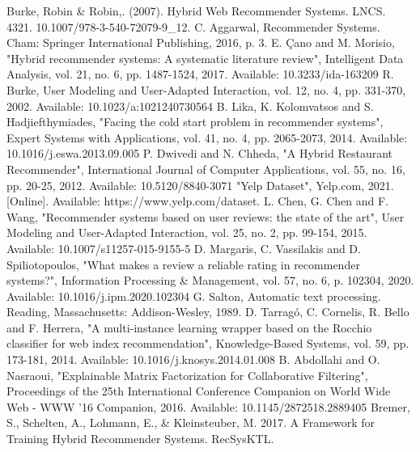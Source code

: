 \documentclass[conference]{IEEEtran}
\begin{document}
\begin{thebibliography}{00}
Burke, Robin \& Robin,. (2007). Hybrid Web Recommender Systems. LNCS. 4321. 10.1007/978-3-540-72079-9\_12.
C. Aggarwal, Recommender Systems. Cham: Springer International Publishing, 2016, p. 3.
E. Çano and M. Morisio, "Hybrid recommender systems: A systematic literature review", Intelligent Data Analysis, vol. 21, no. 6, pp. 1487-1524, 2017. Available: 10.3233/ida-163209
R. Burke, User Modeling and User-Adapted Interaction, vol. 12, no. 4, pp. 331-370, 2002. Available: 10.1023/a:1021240730564
B. Lika, K. Kolomvatsos and S. Hadjiefthymiades, "Facing the cold start problem in recommender systems", Expert Systems with Applications, vol. 41, no. 4, pp. 2065-2073, 2014. Available: 10.1016/j.eswa.2013.09.005
P. Dwivedi and N. Chheda, "A Hybrid Restaurant Recommender", International Journal of Computer Applications, vol. 55, no. 16, pp. 20-25, 2012. Available: 10.5120/8840-3071
"Yelp Dataset", Yelp.com, 2021. [Online]. Available: https://www.yelp.com/dataset.
L. Chen, G. Chen and F. Wang, "Recommender systems based on user reviews: the state of the art", User Modeling and User-Adapted Interaction, vol. 25, no. 2, pp. 99-154, 2015. Available: 10.1007/s11257-015-9155-5
D. Margaris, C. Vassilakis and D. Spiliotopoulos, "What makes a review a reliable rating in recommender systems?", Information Processing \& Management, vol. 57, no. 6, p. 102304, 2020. Available: 10.1016/j.ipm.2020.102304
G. Salton, Automatic text processing. Reading, Massachusetts: Addison-Wesley, 1989.
D. Tarragó, C. Cornelis, R. Bello and F. Herrera, "A multi-instance learning wrapper based on the Rocchio classifier for web index recommendation", Knowledge-Based Systems, vol. 59, pp. 173-181, 2014. Available: 10.1016/j.knosys.2014.01.008
B. Abdollahi and O. Nasraoui, "Explainable Matrix Factorization for Collaborative Filtering", Proceedings of the 25th International Conference Companion on World Wide Web - WWW '16 Companion, 2016. Available: 10.1145/2872518.2889405
Bremer, S., Schelten, A., Lohmann, E., \& Kleinsteuber, M. 2017. A Framework for Training Hybrid Recommender Systems. RecSysKTL.
\end{thebibliography}
\end{document}
